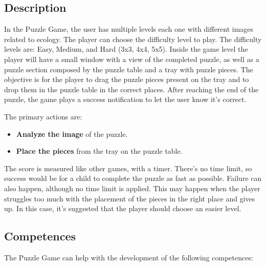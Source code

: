 \subsection*{Description}

In the Puzzle Game, the user has multiple levels each one with different images related to ecology. The player can choose the difficulty level to play. The difficulty levels are: Easy, Medium, and Hard (3x3, 4x4, 5x5). Inside the game level the player will have a small window with a view of the completed puzzle, as well as a puzzle section composed by the puzzle table and a tray with puzzle pieces.
The objective is for the player to drag the puzzle pieces present on the tray and to drop them in the puzzle table in the correct places. After reaching the end of the puzzle, the game plays a success notification to let the user know it's correct.

The primary actions are:

\begin{itemize}
    \item \textbf{Analyze the image} of the puzzle.
    \item \textbf{Place the pieces} from the tray on the puzzle table.
\end{itemize}

The score is measured like other games, with a timer. There's no time limit, so success would be for a child to complete the puzzle as fast as possible. Failure can also happen, although no time limit is applied. This may happen when the player struggles too much with the placement of the pieces in the right place and gives up. In this case, it's suggested that the player should choose an easier level.

\subsection*{Competences}

The Puzzle Game can help with the development of the following competences:

